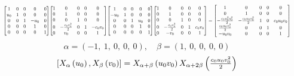 \documentclass[11pt]{article}
\theoremstyle{definition}
\begin{document}
\[
\scaletoalign{\textwidth}{{\left[\begin{matrix}1 & 0 & 0 & 0 & 0\\u_{0} & 1 & 0 & 0 & 0\\0 & 0 & 1 & - u_{0} & 0\\0 & 0 & 0 & 1 & 0\\0 & 0 & 0 & 0 & 1\end{matrix}\right]} {\left[\begin{matrix}1 & 0 & 0 & 0 & 0\\0 & 1 & 0 & 0 & 0\\0 & 0 & 1 & 0 & 0\\0 & - \frac{c_{0} v_{0}^{2}}{2} & 0 & 1 & - c_{0} v_{0}\\0 & v_{0} & 0 & 0 & 1\end{matrix}\right]} {\left[\begin{matrix}1 & 0 & 0 & 0 & 0\\- u_{0} & 1 & 0 & 0 & 0\\0 & 0 & 1 & u_{0} & 0\\0 & 0 & 0 & 1 & 0\\0 & 0 & 0 & 0 & 1\end{matrix}\right]} {\left[\begin{matrix}1 & 0 & 0 & 0 & 0\\0 & 1 & 0 & 0 & 0\\0 & 0 & 1 & 0 & 0\\0 & - \frac{c_{0} v_{0}^{2}}{2} & 0 & 1 & c_{0} v_{0}\\0 & - v_{0} & 0 & 0 & 1\end{matrix}\right]} = {\left[\begin{matrix}1 & 0 & 0 & 0 & 0\\0 & 1 & 0 & 0 & 0\\- \frac{c_{0} u_{0}^{2} v_{0}^{2}}{2} & - \frac{c_{0} u_{0} v_{0}^{2}}{2} & 1 & 0 & c_{0} u_{0} v_{0}\\\frac{c_{0} u_{0} v_{0}^{2}}{2} & 0 & 0 & 1 & 0\\- u_{0} v_{0} & 0 & 0 & 0 & 1\end{matrix}\right]}}
\]
\[
\alpha = \left( -1, \  1, \  0, \  0, \  0\right), \quad \beta = \left( 1, \  0, \  0, \  0, \  0\right)
\]
\[
\scaletoalign{\textwidth}{\left[ X_{\alpha}\left(u_{0}\right), X_{\beta}\left(v_{0}\right) \right] = X_{\alpha + \beta}\left(u_{0} v_{0}\right) X_{\alpha + 2\beta}\left(\frac{c_{0} u_{0} v_{0}^{2}}{2}\right)}
\]
\end{document}
